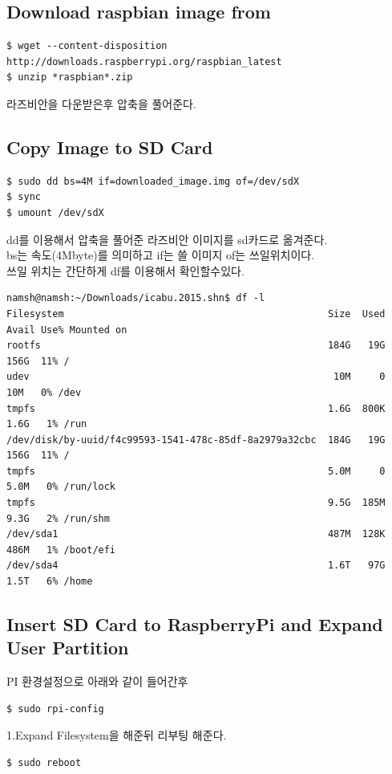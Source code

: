 \documentclass[11pt
  , a4paper
  , article
  , oneside
]{memoir}
\begin{document}
\subsection{Download raspbian image from}
\begin{lstlisting}[style=termstyle]
$ wget --content-disposition http://downloads.raspberrypi.org/raspbian_latest
$ unzip *raspbian*.zip
\end{lstlisting}
라즈비안을 다운받은후 압축을 풀어준다.
\subsection{Copy Image to SD Card}
\begin{lstlisting}[style=termstyle]
$ sudo dd bs=4M if=downloaded_image.img of=/dev/sdX
$ sync
$ umount /dev/sdX
\end{lstlisting}
dd를 이용해서 압축을 풀어준 라즈비안 이미지를 sd카드로 옮겨준다.\\
bs는 속도(4Mbyte)를 의미하고 if는 쓸 이미지 of는 쓰일위치이다.\\
쓰일 위치는 간단하게 df를 이용해서 확인할수있다.
\begin{lstlisting}[style=termstyle]
namsh@namsh:~/Downloads/icabu.2015.shn$ df -l
Filesystem                                              Size  Used Avail Use% Mounted on
rootfs                                                  184G   19G  156G  11% /
udev                                                     10M     0   10M   0% /dev
tmpfs                                                   1.6G  800K  1.6G   1% /run
/dev/disk/by-uuid/f4c99593-1541-478c-85df-8a2979a32cbc  184G   19G  156G  11% /
tmpfs                                                   5.0M     0  5.0M   0% /run/lock
tmpfs                                                   9.5G  185M  9.3G   2% /run/shm
/dev/sda1                                               487M  128K  486M   1% /boot/efi
/dev/sda4                                               1.6T   97G  1.5T   6% /home
\end{lstlisting}
\subsection{Insert SD Card to RaspberryPi and Expand User Partition}
PI 환경설정으로 아래와 같이 들어간후
\begin{lstlisting}[style=termstyle]
$ sudo rpi-config
\end{lstlisting}
1.Expand Filesystem을 해준뒤 리부팅 해준다.
\begin{lstlisting}[style=termstyle]
$ sudo reboot
\end{lstlisting}
\end{document}
